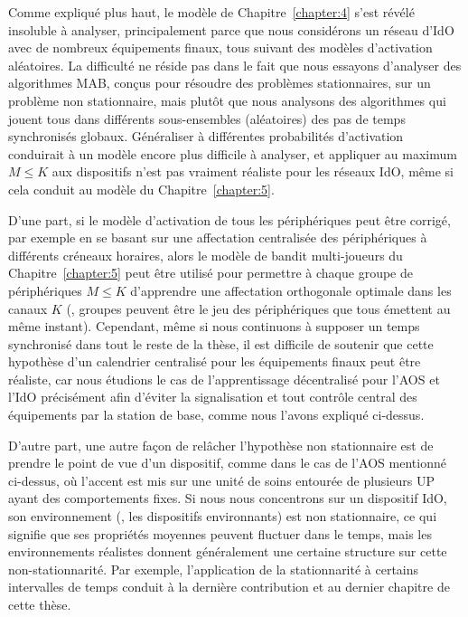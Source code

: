 \begin{resume_fr}
Comme expliqué plus haut, le modèle de Chapitre~\ref{chapter:4} s'est révélé insoluble à analyser, principalement parce que nous considérons un réseau d'IdO avec de nombreux équipements finaux, tous suivant des modèles d'activation aléatoires.
La difficulté ne réside pas dans le fait que nous essayons d'analyser des algorithmes MAB, conçus pour résoudre des problèmes stationnaires, sur un problème non stationnaire,
mais plutôt que nous analysons des algorithmes qui jouent tous dans différents sous-ensembles (aléatoires) des pas de temps synchronisés globaux.
Généraliser à différentes probabilités d'activation conduirait à un modèle encore plus difficile à analyser, et appliquer au maximum $M \leq K$ aux dispositifs n'est pas vraiment réaliste pour les réseaux IdO, même si cela conduit au modèle du Chapitre~\ref{chapter:5}.

D'une part, si le modèle d'activation de tous les périphériques peut être corrigé, par exemple en se basant sur une affectation centralisée des périphériques à différents créneaux horaires, alors le modèle de bandit multi-joueurs du Chapitre~\ref{chapter:5} peut être utilisé pour permettre à chaque groupe de périphériques $M \leq K$ d'apprendre une affectation orthogonale optimale dans les canaux $K$ (\eg, groupes peuvent être le jeu des périphériques que tous émettent au même instant).
%
Cependant, même si nous continuons à supposer un temps synchronisé dans tout le reste de la thèse,
il est difficile de soutenir que cette hypothèse d'un calendrier centralisé pour les équipements finaux peut être réaliste, car nous étudions le cas de l'apprentissage décentralisé pour l'AOS et l'IdO précisément afin d'éviter la signalisation et tout contrôle central des équipements par la station de base, comme nous l'avons expliqué ci-dessus.

D'autre part, une autre façon de relâcher l'hypothèse non stationnaire est de prendre le point de vue d'un dispositif, comme dans le cas de l'AOS mentionné ci-dessus, où l'accent est mis sur une unité de soins entourée de plusieurs UP ayant des comportements fixes.
Si nous nous concentrons sur un dispositif IdO, son environnement (\ie, les dispositifs environnants) est non stationnaire, ce qui signifie que ses propriétés moyennes peuvent fluctuer dans le temps, mais les environnements réalistes donnent généralement une certaine structure sur cette non-stationnarité.
Par exemple, l'application de la stationnarité à certains intervalles de temps conduit à la dernière contribution et au dernier chapitre de cette thèse.



\end{resume_fr}
